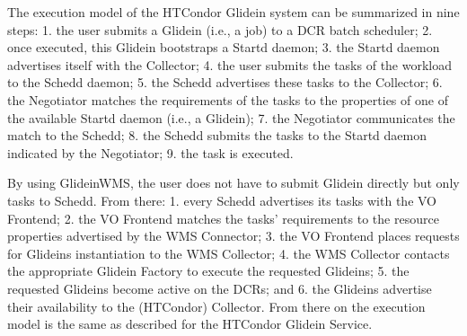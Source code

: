 The execution model of the HTCondor Glidein system can be summarized in nine
steps: 1. the user submits a Glidein (i.e., a job) to a DCR batch scheduler; 2.
once executed, this Glidein bootstraps a Startd daemon; 3. the Startd daemon
advertises itself with the Collector; 4. the user submits the tasks of the
workload to the Schedd daemon; 5. the Schedd advertises these tasks to the
Collector; 6. the Negotiator matches the requirements of the tasks to the
properties of one of the available Startd daemon (i.e., a Glidein); 7. the
Negotiator communicates the match to the Schedd; 8. the Schedd submits the tasks
to the Startd daemon indicated by the Negotiator; 9. the task is executed.

By using GlideinWMS, the user does not have to submit Glidein directly but only
tasks to Schedd. From there: 1. every Schedd advertises its tasks with the VO
Frontend; 2. the VO Frontend matches the tasks’ requirements to the resource
properties advertised by the WMS Connector; 3. the VO Frontend places requests
for Glideins instantiation to the WMS Collector; 4. the WMS Collector contacts
the appropriate Glidein Factory to execute the requested Glideins; 5. the
requested Glideins become active on the DCRs; and 6. the Glideins advertise
their availability to the (HTCondor) Collector. From there on the execution
model is the same as described for the HTCondor Glidein Service.

